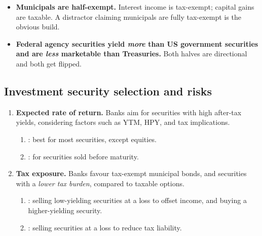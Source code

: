 \begin{lrtrapbox}
\begin{itemize}
\item \textbf{Municipals are half-exempt.} Interest income is tax-exempt; capital gains are taxable. A distractor claiming municipals are fully tax-exempt is the obvious build.
\item \textbf{Federal agency securities yield \emph{more} than US government securities and are \emph{less} marketable than Treasuries.} Both halves are directional and both get flipped.
\end{itemize}
\end{lrtrapbox}


\subsection{Investment security selection and risks}

\begin{enumerate}
\item \textbf{Expected rate of return.} Banks aim for securities with high after-tax yields, considering factors such as YTM, HPY, and tax implications.
  \begin{enumerate}[label=\alph*)]
  \item {}: best for most securities, except equities.
  \item {}: for securities sold before maturity.
  \end{enumerate}
\item \textbf{Tax exposure.} Banks favour tax-exempt municipal bonds, and securities with a \emph{lower tax burden}, compared to taxable options.
  \begin{enumerate}[label=\alph*)]
  \item {}: selling low-yielding securities at a loss to offset income, and buying a higher-yielding security.
  \item {}: selling securities at a loss to reduce tax liability.
  \end{enumerate}
\end{enumerate}

